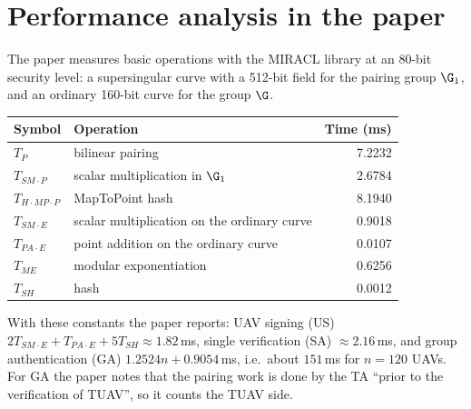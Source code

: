 \section{Performance analysis in the paper}
The paper measures basic operations with the MIRACL library at an 80-bit security level: a supersingular curve with a 512-bit field for the pairing
group $\G_1$, and an ordinary 160-bit curve for the group $\G$.
\begin{center}
\small
\begin{tabular}{@{}l l r@{}}
\toprule
\textbf{Symbol} & \textbf{Operation} & \textbf{Time (ms)}\\
\midrule
$T_P$ & bilinear pairing & 7.2232\\
$T_{SM\cdot P}$ & scalar multiplication in $\G_1$ & 2.6784\\
$T_{H\cdot MP\cdot P}$ & MapToPoint hash & 8.1940\\
$T_{SM\cdot E}$ & scalar multiplication on the ordinary curve & 0.9018\\
$T_{PA\cdot E}$ & point addition on the ordinary curve & 0.0107\\
$T_{ME}$ & modular exponentiation & 0.6256\\
$T_{SH}$ & hash & 0.0012\\
\bottomrule
\end{tabular}
\end{center}
With these constants the paper reports: UAV signing (US) $2T_{SM\cdot E}+T_{PA\cdot E}+5T_{SH}\approx1.82$\,ms, single verification (SA)
$\approx2.16$\,ms, and group authentication (GA) $1.2524n+0.9054$\,ms, i.e.\ about $151$\,ms for $n=120$ UAVs. For GA the paper notes that the pairing
work is done by the TA ``prior to the verification of TUAV'', so it counts the TUAV side.

